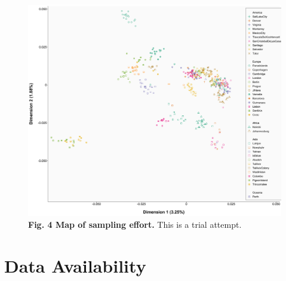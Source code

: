 \documentclass[twoside, british, a4paper]{article}
\begin{document}
\begin{figure}[!ht]
\centering
\includegraphics[scale=0.4]{../FPG--Plots/FPG--MDS/FPG--MDS.pdf}
\caption*{ \scriptsize \textbf{Fig. 4 Map of sampling effort.} This is a trial attempt.}
\label{MainText:FPG--MDS}
\end{figure}

\newpage
\clearpage

\printbibliography

\section*{Data Availability}
\end{document}

